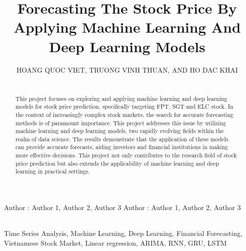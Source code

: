 \documentclass{ieeeojies}
\begin{document}
\title{Forecasting The Stock Price By Applying Machine Learning And Deep Learning Models}

\author{\uppercase{HOANG QUOC VIET},
\uppercase{TRUONG VINH THUAN, and HO DAC KHAI}}

\address[1]{Faculty of Information Systems, University of Information Technology, (e-mail: 21522790@gm.uit.edu.vn)}
\address[2]{Faculty of Information Systems, University of Information Technology, (e-mail: 21522653@gm.uit.edu.vn)}
\address[3]{Faculty of Information Systems, University of Information Technology, (e-mail: 21522183@gm.uit.edu.vn)}

\markboth
{Author \headeretal: Author 1, Author 2, Author 3}
{Author \headeretal: Author 1, Author 2, Author 3}

\begin{abstract}
\\
\hspace*{0.5cm} This project focuses on exploring and applying machine learning and deep learning models for stock price prediction, specifically targeting FPT, SGT and ELC stock. In the context of increasingly complex stock markets, the search for accurate forecasting methods is of paramount importance. This project addresses this issue by utilizing machine learning and deep learning models, two rapidly evolving fields within the realm of data science. The results demonstrate that the application of these models can provide accurate forecasts, aiding investors and financial institutions in making more effective decisions. This project not only contributes to the research field of stock price prediction but also extends the applicability of machine learning and deep learning in practical settings.
\end{abstract}

\begin{keywords}
\\
\hspace*{0.5cm} Time Series Analysis, Machine Learning, Deep Learning,  Financial Forecasting, Vietnamese Stock Market, Linear regression, ARIMA, RNN, GRU, LSTM
\end{keywords}

\titlepgskip=-15pt

\maketitle
\end{document}
